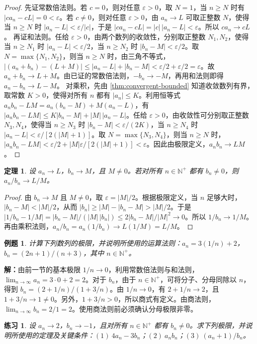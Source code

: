 \documentclass[UTF8,fontset=fandol,11pt]{ctexart}
\newtheorem{theorem}[definition]{定理}
\newtheorem{example}[definition]{例题}
\newtheorem{exercise}[definition]{练习}
\begin{document}
\begin{proof}
先证常数倍法则。若 $c=0$，则对任意 $\varepsilon>0$，取 $N=1$，当 $n\geq N$ 时有 $|ca_n-cL|=0<\varepsilon$。若 $c\neq0$，则对任意 $\varepsilon>0$，由 $a_n\to L$ 可取正整数 $N$，使得当 $n\geq N$ 时 $|a_n-L|<\varepsilon/|c|$，于是 $|ca_n-cL|=|c|\,|a_n-L|<\varepsilon$。所以 $ca_n\to cL$。
再证和法则。任给 $\varepsilon>0$，由两个数列的收敛性，分别取正整数 $N_1,N_2$，使得当 $n\geq N_1$ 时 $|a_n-L|<\varepsilon/2$，当 $n\geq N_2$ 时 $|b_n-M|<\varepsilon/2$。取 $N=\max\{N_1,N_2\}$，则当 $n\geq N$ 时，由三角不等式，$|(a_n+b_n)-(L+M)|\leq|a_n-L|+|b_n-M|<\varepsilon/2+\varepsilon/2=\varepsilon$。故 $a_n+b_n\to L+M$。由已证的常数倍法则，$-b_n\to-M$，再用和法则即得 $a_n-b_n\to L-M$。
对乘积，先由 \ref{thm:convergent-bounded} 知道收敛数列有界，取常数 $K>0$，使得对所有 $n$ 都有 $|a_n|\leq K$。利用恒等式 $a_nb_n-LM=a_n(b_n-M)+M(a_n-L)$，有 $|a_nb_n-LM|\leq K|b_n-M|+|M|\,|a_n-L|$。任给 $\varepsilon>0$，由收敛性可分别取正整数 $N_3,N_4$，使得当 $n\geq N_3$ 时 $|b_n-M|<\varepsilon/(2K)$，当 $n\geq N_4$ 时 $|a_n-L|<\varepsilon/[2(|M|+1)]$。取 $N=\max\{N_3,N_4\}$，则当 $n\geq N$ 时，$|a_nb_n-LM|<\varepsilon/2+|M|\varepsilon/[2(|M|+1)]<\varepsilon$。因此由极限定义，$a_nb_n\to LM$。
\end{proof}
\begin{theorem}
\label{thm:limit-quotient}设 $a_n\to L$，$b_n\to M$，且 $M\neq0$。若对所有 $n\in\mathbb{N}^{+}$ 都有 $b_n\neq0$，则 $a_n/b_n\to L/M$。
\end{theorem}
\begin{proof}
由 $b_n\to M$ 且 $M\neq0$，取 $\varepsilon=|M|/2$。根据极限定义，当 $n$ 足够大时，$|b_n-M|<|M|/2$，从而 $|b_n|\geq|M|-|b_n-M|>|M|/2$。于是 $|1/b_n-1/M|=|b_n-M|/(|M|\,|b_n|)\leq2|b_n-M|/|M|^2\to0$。所以 $1/b_n\to1/M$。再由乘积法则，$a_n/b_n=a_n(1/b_n)\to L(1/M)=L/M$。
\end{proof}
\begin{example}
计算下列数列的极限，并说明所使用的运算法则：$a_n=3(1/n)+2$，$b_n=(2n+1)/(n+3)$，其中 $n\in\mathbb{N}^{+}$。
\end{example}
\par\noindent\textbf{解：}由前一节的基本极限 $1/n\to0$，利用常数倍法则与和法则，$\lim_{n\to\infty}a_n=3\cdot0+2=2$。对于 $b_n$，由于 $n\in\mathbb{N}^{+}$，可将分子、分母同除以 $n$，得到 $b_n=(2+1/n)/(1+3/n)$。由 $1/n\to0$，有 $2+1/n\to2$，且 $1+3/n\to1\neq0$。另外，$1+3/n>0$，所以商式有定义。由商法则，$\lim_{n\to\infty}b_n=2/1=2$。使用商法则前必须确认分母极限非零。\par
\begin{exercise}
\label{mathagent:exercise:8760977b7c41a7ab2d82304ea81f33749e9976ddafc1f87583b542c4b8793254}
设 $a_n\to2$，$b_n\to-1$，且对所有 $n\in\mathbb{N}^{+}$ 都有 $b_n\neq0$。求下列极限，并说明所使用的定理及关键条件：$(1)\ 4a_n-3b_n$；$(2)\ a_nb_n$；$(3)\ (a_n+1)/b_n$。
\end{exercise}
\end{document}
